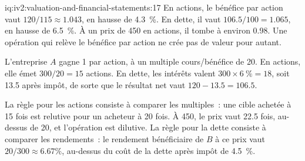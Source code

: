 \begin{solution}{iq:iv2:valuation-and-financial-statements:17}
En actions, le bénéfice par action vaut $120/115 \approx 1.043$, en hausse de 4.3~\%. En dette, il vaut $106.5/100 = 1.065$, en hausse de 6.5~\%. À un prix de 450 en actions, il tombe à environ 0.98. Une opération qui relève le bénéfice par action ne crée pas de valeur pour autant.

L'entreprise $A$ gagne 1 par action, à un multiple cours/bénéfice de 20. En actions, elle émet $300/20 = 15$ actions. En dette, les intérêts valent $300 \times 6~\% = 18$, soit 13.5 après impôt, de sorte que le résultat net vaut $120 - 13.5 = 106.5$.

La règle pour les actions consiste à comparer les multiples~: une cible achetée à 15 fois est relutive pour un acheteur à 20 fois. À 450, le prix vaut 22.5 fois, au-dessus de 20, et l'opération est dilutive. La règle pour la dette consiste à comparer les rendements~: le rendement bénéficiaire de $B$ à ce prix vaut $20/300 \approx 6.67\%$, au-dessus du coût de la dette après impôt de 4.5~\%.

\end{solution}

